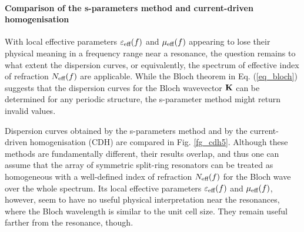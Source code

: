 
\paragraph{Comparison of the s-parameters method and current-driven homogenisation}%
With local effective parameters $\varepsilon_{\text{eff} }(f)$ and $\mu_{\text{eff} }(f)$ appearing to lose their physical meaning in a frequency range near a resonance, the question remains to what extent the dispersion curves, or equivalently, the spectrum of effective index of refraction $N_{\text{eff} }(f)$ are applicable. While the Bloch theorem in Eq. (\ref{eq_bloch}) suggests that the dispersion curves for the Bloch wavevector ${\mathbf{K}}$ can be determined for any periodic structure, the s-parameter method might return invalid values.

Dispersion curves obtained by the s-parameters method and by the current-driven homogenisation (CDH) are compared in Fig. \ref{fg_cdh5}. Although these methods are fundamentally different, their results overlap, and thus one can assume that the array of symmetric split-ring resonators can be treated as homogeneous with a well-defined index of refraction $N_{\text{eff} }(f)$ for the Bloch wave over the whole spectrum. Its local effective parameters $\varepsilon_{\text{eff} }(f)$ and $\mu_{\text{eff} }(f)$, however, seem to have no useful physical interpretation near the resonances, where the Bloch wavelength is similar to the unit cell size. They remain useful farther from the resonance, though. %

